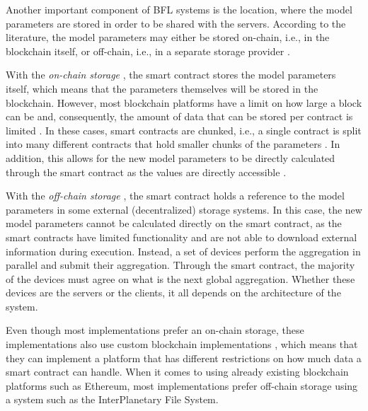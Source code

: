 Another important component of BFL systems is the location, where the model parameters are stored in order to be shared with the servers. According to the literature, the model parameters may either be stored on-chain, i.e., in the blockchain itself, or off-chain, i.e., in a separate storage provider \cite{10.48550/arxiv.2104.10501}.

With the \textit{on-chain storage} \cite{9274451, baffle, demo, 8733825, 9524833, 8894364, 9184854, 8893114}, the smart contract stores the model parameters itself, which means that the parameters themselves will be stored in the blockchain. However, most blockchain platforms have a limit on how large a block can be and, consequently, the amount of data that can be stored per contract is limited \cite{9274451}. In these cases, smart contracts are chunked, i.e., a single contract is split into many different contracts that hold smaller chunks of the parameters \cite{baffle}. In addition, this allows for the new model parameters to be directly calculated through the smart contract as the values are directly accessible  \cite{9274451}.
    
With the \textit{off-chain storage} \cite{10.1145/3319535.3363256, 10.48550/arxiv.2011.07516, 8945913, 10.48550/arxiv.2202.02817, 10.48550/arxiv.2007.03856, 10.48550/arxiv.1910.12603, Peyvandi2022, 9170559}, the smart contract holds a reference to the model parameters in some external (decentralized) storage systems. In this case, the new model parameters cannot be calculated directly on the smart contract, as the smart contracts have limited functionality and are not able to download external information during execution. Instead, a set of devices perform the aggregation in parallel and submit their aggregation. Through the smart contract, the majority of the devices must agree on what is the next global aggregation. Whether these devices are the servers or the clients, it all depends on the architecture of the system.

Even though most implementations prefer an on-chain storage, these implementations also use custom blockchain implementations \cite{8733825, 9524833, 8894364, 9184854, 8893114}, which means that they can implement a platform that has different restrictions on how much data a smart contract can handle. When it comes to using already existing blockchain platforms such as Ethereum, most implementations prefer off-chain storage using a system such as the InterPlanetary File System\cite{10.48550/arxiv.2007.03856, 8945913, Peyvandi2022, 9170559, 10.1145/3319535.3363256, 10.48550/arxiv.2011.07516}.

